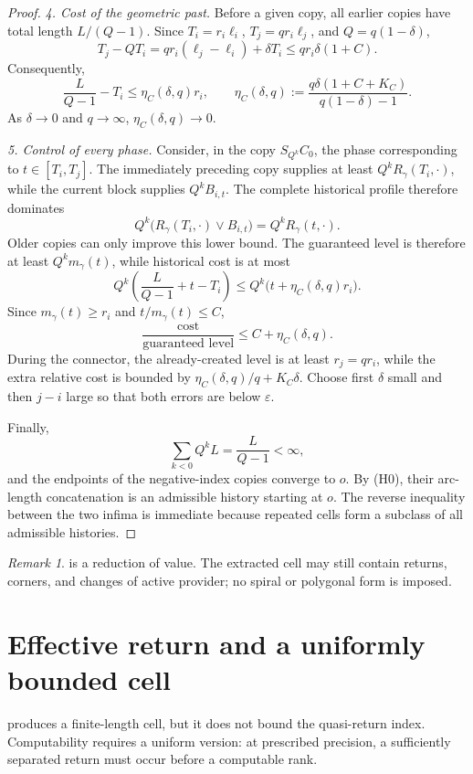 \documentclass[10pt,a4paper]{article}
\theoremstyle{definition}
\theoremstyle{remark}
\newtheorem{remark}[remark]{Remark}
\newcommand{\vmax}{\mathbin{\vee}}
\newcommand{\eps}{\varepsilon}
\begin{document}
\begin{proof}
\emph{4. Cost of the geometric past.}
Before a given copy, all earlier copies have total length $L/(Q-1)$. Since $T_i=r_i\ell_i$, $T_j=qr_i\ell_j$, and $Q=q(1-\delta)$,
\[
T_j-QT_i
=qr_i(\ell_j-\ell_i)+\delta T_i
\le qr_i\delta(1+C).
\]
Consequently,
\begin{equation}
\frac{L}{Q-1}-T_i
\le \eta_C(\delta,q)r_i,
\qquad
\eta_C(\delta,q):=
\frac{q\delta(1+C+K_C)}{q(1-\delta)-1}.
\label{eq:eta}
\end{equation}
As $\delta\to0$ and $q\to\infty$, $\eta_C(\delta,q)\to0$.

\emph{5. Control of every phase.}
Consider, in the copy $S_{Q^k}C_0$, the phase corresponding to $t\in[T_i,T_j]$. The immediately preceding copy supplies at least $Q^kR_\gamma(T_i,\cdot)$, while the current block supplies $Q^kB_{i,t}$. The complete historical profile therefore dominates
\[
Q^k\bigl(R_\gamma(T_i,\cdot)\vmax B_{i,t}\bigr)
=Q^kR_\gamma(t,\cdot).
\]
Older copies can only improve this lower bound. The guaranteed level is therefore at least $Q^km_\gamma(t)$, while historical cost is at most
\[
Q^k\left(\frac{L}{Q-1}+t-T_i\right)
\le Q^k\bigl(t+\eta_C(\delta,q)r_i\bigr).
\]
Since $m_\gamma(t)\ge r_i$ and $t/m_\gamma(t)\le C$,
\[
\frac{\text{cost}}{\text{guaranteed level}}
\le C+\eta_C(\delta,q).
\]
During the connector, the already-created level is at least $r_j=qr_i$, while the extra relative cost is bounded by $\eta_C(\delta,q)/q+K_C\delta$. Choose first $\delta$ small and then $j-i$ large so that both errors are below $\eps$.

Finally,
\[
\sum_{k<0}Q^kL=\frac{L}{Q-1}<\infty,
\]
and the endpoints of the negative-index copies converge to $o$. By (H0), their arc-length concatenation is an admissible history starting at $o$. The reverse inequality between the two infima is immediate because repeated cells form a subclass of all admissible histories.
\end{proof}

\begin{remark}
\label{rem:cell-shape}
 is a reduction of value. The extracted cell may still contain returns, corners, and changes of active provider; no spiral or polygonal form is imposed.
\end{remark}

\section{Effective return and a uniformly bounded cell}
 produces a finite-length cell, but it does not bound the quasi-return index. Computability requires a uniform version: at prescribed precision, a sufficiently separated return must occur before a computable rank.
\end{document}
